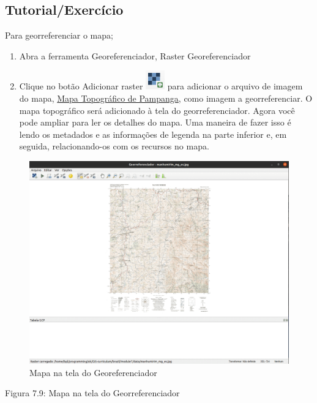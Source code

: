 \documentclass[
]{krantz}
\providecommand{\tightlist}{%
  \setlength{\itemsep}{0pt}\setlength{\parskip}{0pt}}
\begin{document}
\hypertarget{tutorialexercuxedcio-8}{%
\subsection{Tutorial/Exercício}\label{tutorialexercuxedcio-8}}

Para georreferenciar o mapa;

\begin{enumerate}
\def\labelenumi{\arabic{enumi}.}
\tightlist
\item
  Abra a ferramenta Georeferenciador, Raster Georeferenciador
\item
  Clique no botão Adicionar raster \includegraphics{media/modulo7/add-raster.png} para adicionar o arquivo de imagem do mapa, \href{data/module7/manhumirim_mg_es.jpg}{Mapa Topográfico de Pampanga}, como imagem a georreferenciar. O mapa topográfico será adicionado à tela do georreferenciador. Agora você pode ampliar para ler os detalhes do mapa. Uma maneira de fazer isso é lendo os metadados e as informações de legenda na parte inferior e, em seguida, relacionando-os com os recursos no mapa.
\end{enumerate}

\begin{figure}
\centering
\includegraphics{media/modulo7/georeferencer.png}
\caption{Mapa na tela do Georeferenciador}
\end{figure}

Figura 7.9: Mapa na tela do Georreferenciador
\end{document}
